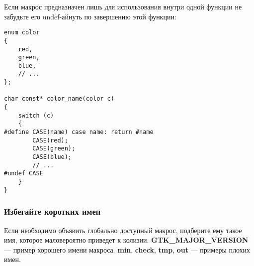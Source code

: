 Если макрос предназначен лишь для использования внутри одной функции не забудьте его undef-айнуть по завершению этой функции:

\begin{verbatim}
enum color
{
    red,
    green,
    blue,
    // ...
};

char const* color_name(color c)
{
    switch (c)
    {
#define CASE(name) case name: return #name
        CASE(red);
        CASE(green);
        CASE(blue);
        // ...
#undef CASE
    }
}
\end{verbatim}

\subsubsection{Избегайте коротких имен}

Если необходимо объявить глобально доступный макрос, подберите ему такое имя, которое маловероятно приведет к колизии. {\bf GTK\_MAJOR\_VERSION} --- пример хорошего имени макроса. {\bf min}, {\bf check}, {\bf tmp}, {\bf out} --- примеры плохих имен.
